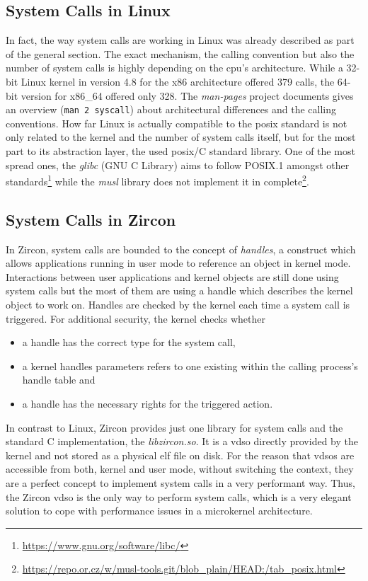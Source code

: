 \subsection{System Calls in Linux}
In fact, the way system calls are working in Linux was already described as part of the general section. 
The exact mechanism, the calling convention but also the number of system calls is highly depending on the \ac{cpu}'s architecture.
While a 32-bit Linux kernel in version 4.8 for the x86 architecture offered 379 calls, the 64-bit version for x86\_64 offered only 328\cite{lfd430}.
The \textit{man-pages} project documents gives an overview (\texttt{man 2 syscall}) about architectural differences and the calling conventions.
How far Linux is actually compatible to the \ac{posix} standard is not only related to the kernel and the number of system calls itself, but for the most part to its abstraction layer, the used \ac{posix}/C standard library.
One of the most spread ones, the \textit{glibc} (GNU C Library) aims to follow POSIX.1 amongst other standards\footnote{\url{https://www.gnu.org/software/libc/}} while the \textit{musl} library does not implement it in complete\footnote{\url{https://repo.or.cz/w/musl-tools.git/blob_plain/HEAD:/tab_posix.html}}.



\subsection{System Calls in Zircon}
In Zircon, system calls are bounded to the concept of \textit{handles}, a construct which allows applications running in user mode to reference an object in kernel mode\cite{zircon-handle}.
Interactions between user applications and kernel objects are still done using system calls but the most of them are using a handle which describes the kernel object to work on\cite{zircon-concepts}. 
Handles are checked by the kernel each time a system call is triggered.
For additional security, the kernel checks whether
\begin{itemize}
    \item a handle has the correct type for the system call, 
    \item a kernel handles parameters refers to one existing within the calling process's handle table and
    \item a handle has the necessary rights for the triggered action\cite{zircon-concepts}.
\end{itemize}
% 
In contrast to Linux, Zircon provides just one library for system calls and the standard C implementation, the \textit{libzircon.so}.
It is a \acf{vdso} directly provided by the kernel and not stored as a physical \ac{elf} file on disk.
For the reason that \acp{vdso} are accessible from both, kernel and user mode, without switching the context, they are a perfect concept to implement system calls in a very performant way\cite{vdso-linuxjournal}.
Thus, the Zircon \ac{vdso} is the only way to perform system calls\cite{zircon-vdso}, which is a very elegant solution to cope with performance issues in a microkernel architecture.

